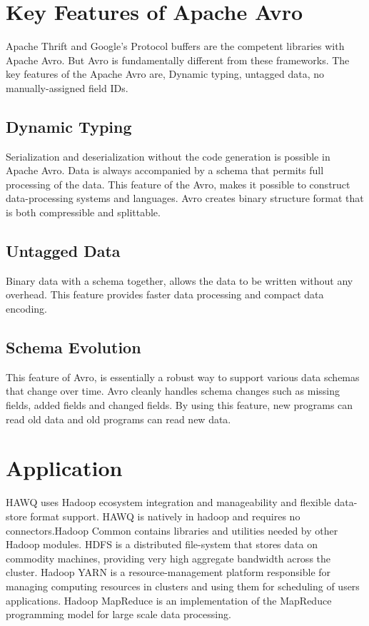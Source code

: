\documentclass[9pt,twocolumn,twoside]{../../styles/osajnl}
\begin{document}
\section{Key Features of Apache Avro}

Apache Thrift and Google’s Protocol buffers are the competent
libraries with Apache Avro. But Avro is fundamentally different from
these frameworks. The key features of the Apache Avro are, Dynamic
typing, untagged data, no manually-assigned field IDs.

\subsection{Dynamic Typing}

Serialization and deserialization without the code generation is
possible in Apache Avro. Data is always accompanied by a schema that
permits full processing of the data. This feature of the Avro, makes
it possible to construct data-processing systems and languages. Avro
creates binary structure format that is both compressible and
splittable.

\subsection{Untagged Data}

Binary data with a schema together, allows the data to be written
without any overhead. This feature provides faster data processing and
compact data encoding.

\subsection{Schema Evolution}

This feature of Avro, is essentially a robust way to support various
data schemas that change over time.  Avro cleanly handles schema
changes such as missing fields, added fields and changed fields. By
using this feature, new programs can read old data and old programs
can read new data.

\section{Application}

HAWQ uses {Hadoop ecosystem}\cite{www-about-hadoop} integration and 
manageability and flexible data-store format support. HAWQ is 
natively in hadoop and requires no connectors.Hadoop Common contains 
libraries and utilities needed by other Hadoop modules. HDFS is a 
distributed file-system that stores data on commodity machines, 
providing very high aggregate bandwidth across the cluster. Hadoop 
YARN is a resource-management platform responsible for managing 
computing resources in clusters and using them for scheduling of 
users applications. Hadoop MapReduce is an implementation of the 
MapReduce programming model for large scale data processing.  
\end{document}
